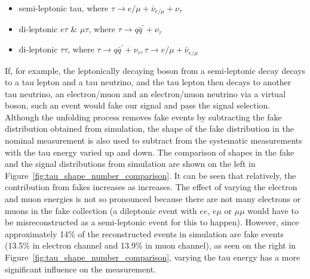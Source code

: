 \begin{itemize}
 \item semi-leptonic tau, where $\tau \rightarrow e/\mu + \bar{\nu}_{e/\mu} + \nu_{\tau}$
 \item di-leptonic $e\tau$ \& $\mu\tau$, where $\tau \rightarrow q\bar{q}^{'} + \nu_\tau$
 \item di-leptonic $\tau\tau$, where $\tau \rightarrow q\bar{q}^{'} + \nu_\tau, \tau \rightarrow e/\mu
 + \bar{\nu}_{e/\mu}$
\end{itemize}

If, for example, the leptonically decaying \W boson from a semi-leptonic \ttbar decay decays to a tau lepton
and a tau neutrino, and the tau lepton then decays to another tau neutrino, an electron/muon and an
electron/muon neutrino via a virtual \W boson, such an event would fake our signal and pass the \ttbar signal
selection. Although the unfolding process removes fake events by subtracting the fake distribution obtained
from simulation, the shape of the fake distribution in the nominal measurement is also used to subtract from
the systematic measurements with the tau energy varied up and down. The comparison of shapes in the fake and
the signal distributions from \ttbar simulation are shown on the left in
Figure~\ref{fig:tau_shape_number_comparison}. It can be seen that relatively, the contribution from fakes
increases as \met increases. The effect of varying the electron and muon energies is not so pronounced because
there are not many electrons or muons in the fake collection (a dileptonic \ttbar event with $ee$, $e\mu$ or
$\mu\mu$ would have to be misreconstructed as a semi-leptonic event for this to happen). However, since
approximately 14\% of the reconstructed \ttbar events in simulation are fake events (13.5\% in electron
channel and 13.9\% in muon channel), as seen on the right in Figure~\ref{fig:tau_shape_number_comparison},
varying the tau energy has a more significant influence on the measurement.

